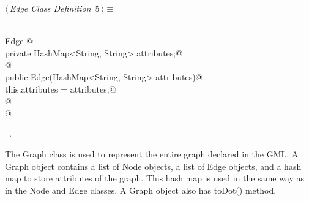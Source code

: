 \documentclass[a4paper]{report}
\begin{document}
\begin{flushleft} \small
\begin{minipage}{\linewidth}\label{scrap5}\raggedright\small
{} $\langle\,${\itshape Edge Class Definition}\nobreak\ {\footnotesize {5}}$\,\rangle\equiv$
\vspace{-1ex}
\begin{list}{}{} \item
\mbox{}\verb@@\\
\mbox{}\verb@class Edge {@\\
\mbox{}\verb@        private HashMap<String, String> attributes;@\\
\mbox{}\verb@        @\\
\mbox{}\verb@        public Edge(HashMap<String, String> attributes){@\\
\mbox{}\verb@                this.attributes = attributes;@\\
\mbox{}\verb@        }@\\
\mbox{}\verb@}@\\
\mbox{}\verb@@{\NWsep}
\end{list}
\vspace{-1.5ex}
\footnotesize
\begin{list}{}{\setlength{\itemsep}{-\parsep}\setlength{\itemindent}{-\leftmargin}}
\item \NWtxtMacroRefIn\ .

\item{}
\end{list}
\end{minipage}\vspace{4ex}
\end{flushleft}
The Graph class is used to represent the entire graph declared in the GML. A Graph object contains a list of Node objects, a list of Edge objects, and a 
hash map to store attributes of the graph. This hash map is used in the same way as in the Node and Edge classes. A Graph object also has toDot() method.
\end{document}
